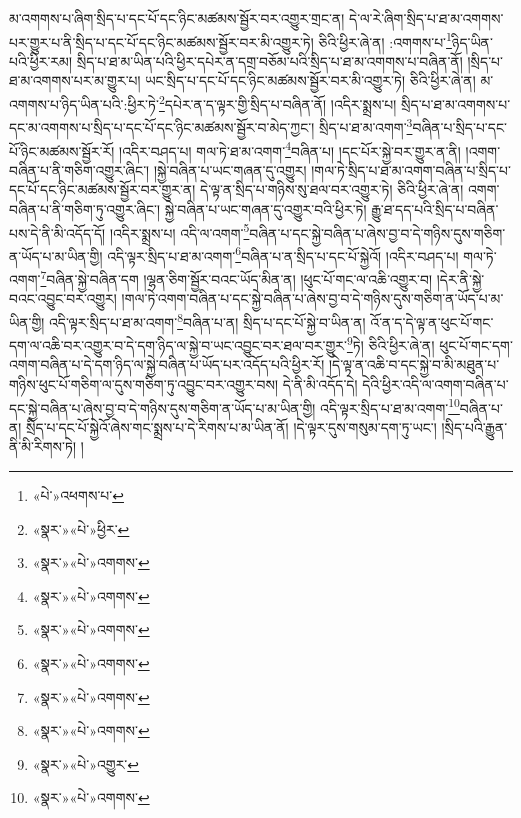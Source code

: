 མ་འགགས་པ་ཞིག་སྲིད་པ་དང་པོ་དང་ཉིང་མཚམས་སྦྱོར་བར་འགྱུར་གྲང་ན། དེ་ལ་རེ་ཞིག་སྲིད་པ་ཐ་མ་འགགས་པར་གྱུར་པ་ནི་སྲིད་པ་དང་པོ་དང་ཉིང་མཚམས་སྦྱོར་བར་མི་འགྱུར་ཏེ། ཅིའི་ཕྱིར་ཞེ་ན། :འགགས་པ་\footnote{«པེ་»འཕགས་པ་}ཉིད་ཡིན་པའི་ཕྱིར་རམ། སྲིད་པ་ཐ་མ་ཡིན་པའི་ཕྱིར་དཔེར་ན་དགྲ་བཅོམ་པའི་སྲིད་པ་ཐ་མ་འགགས་པ་བཞིན་ནོ། །སྲིད་པ་ཐ་མ་འགགས་པར་མ་གྱུར་པ། ཡང་སྲིད་པ་དང་པོ་དང་ཉིང་མཚམས་སྦྱོར་བར་མི་འགྱུར་ཏེ། ཅིའི་ཕྱིར་ཞེ་ན། མ་འགགས་པ་ཉིད་ཡིན་པའི་:ཕྱིར་ཏེ་\footnote{«སྣར་»«པེ་»ཕྱིར་}དཔེར་ན་ད་ལྟར་གྱི་སྲིད་པ་བཞིན་ནོ། །འདིར་སྨྲས་པ། སྲིད་པ་ཐ་མ་འགགས་པ་དང་མ་འགགས་པ་སྲིད་པ་དང་པོ་དང་ཉིང་མཚམས་སྦྱོར་བ་མེད་ཀྱང་། སྲིད་པ་ཐ་མ་འགག་\footnote{«སྣར་»«པེ་»འགགས་}བཞིན་པ་སྲིད་པ་དང་པོ་ཉིང་མཚམས་སྦྱོར་རོ། །འདིར་བཤད་པ། གལ་ཏེ་ཐ་མ་འགག་\footnote{«སྣར་»«པེ་»འགགས་}བཞིན་པ། །དང་པོར་སྐྱེ་བར་གྱུར་ན་ནི། །འགག་བཞིན་པ་ནི་གཅིག་འགྱུར་ཞིང་། །སྐྱེ་བཞིན་པ་ཡང་གཞན་དུ་འགྱུར། །གལ་ཏེ་སྲིད་པ་ཐ་མ་འགག་བཞིན་པ་སྲིད་པ་དང་པོ་དང་ཉིང་མཚམས་སྦྱོར་བར་གྱུར་ན། དེ་ལྟ་ན་སྲིད་པ་གཉིས་སུ་ཐལ་བར་འགྱུར་ཏེ། ཅིའི་ཕྱིར་ཞེ་ན། འགག་བཞིན་པ་ནི་གཅིག་ཏུ་འགྱུར་ཞིང་། སྐྱེ་བཞིན་པ་ཡང་གཞན་དུ་འགྱུར་བའི་ཕྱིར་ཏེ། རྒྱུ་ཐ་དད་པའི་སྲིད་པ་བཞིན་པས་དེ་ནི་མི་འདོད་དོ། །འདིར་སྨྲས་པ། འདི་ལ་འགག་\footnote{«སྣར་»«པེ་»འགགས་}བཞིན་པ་དང་སྐྱེ་བཞིན་པ་ཞེས་བྱ་བ་དེ་གཉིས་དུས་གཅིག་ན་ཡོད་པ་མ་ཡིན་གྱི། འདི་ལྟར་སྲིད་པ་ཐ་མ་འགག་\footnote{«སྣར་»«པེ་»འགགས་}བཞིན་པ་ན་སྲིད་པ་དང་པོ་སྐྱེའོ། །འདིར་བཤད་པ། གལ་ཏེ་འགག་\footnote{«སྣར་»«པེ་»འགགས་}བཞིན་སྐྱེ་བཞིན་དག །ལྷན་ཅིག་སྦྱོར་བའང་ཡོད་མིན་ན། །ཕུང་པོ་གང་ལ་འཆི་འགྱུར་བ། །དེར་ནི་སྐྱེ་བའང་འབྱུང་བར་འགྱུར། །གལ་ཏེ་འགག་བཞིན་པ་དང་སྐྱེ་བཞིན་པ་ཞེས་བྱ་བ་དེ་གཉིས་དུས་གཅིག་ན་ཡོད་པ་མ་ཡིན་གྱི། འདི་ལྟར་སྲིད་པ་ཐ་མ་འགག་\footnote{«སྣར་»«པེ་»འགགས་}བཞིན་པ་ན། སྲིད་པ་དང་པོ་སྐྱེ་བ་ཡིན་ན། འོ་ན་ད་དེ་ལྟ་ན་ཕུང་པོ་གང་དག་ལ་འཆི་བར་འགྱུར་བ་དེ་དག་ཉིད་ལ་སྐྱེ་བ་ཡང་འབྱུང་བར་ཐལ་བར་གྱུར་\footnote{«སྣར་»«པེ་»འགྱུར་}ཏེ། ཅིའི་ཕྱིར་ཞེ་ན། ཕུང་པོ་གང་དག་འགག་བཞིན་པ་དེ་དག་ཉིད་ལ་སྐྱེ་བཞིན་པ་ཡོད་པར་འདོད་པའི་ཕྱིར་རོ། །དེ་ལྟ་ན་འཆི་བ་དང་སྐྱེ་བ་མི་མཐུན་པ་གཉིས་ཕུང་པོ་གཅིག་ལ་དུས་གཅིག་ཏུ་འབྱུང་བར་འགྱུར་བས། དེ་ནི་མི་འདོད་དེ། དེའི་ཕྱིར་འདི་ལ་འགག་བཞིན་པ་དང་སྐྱེ་བཞིན་པ་ཞེས་བྱ་བ་དེ་གཉིས་དུས་གཅིག་ན་ཡོད་པ་མ་ཡིན་གྱི། འདི་ལྟར་སྲིད་པ་ཐ་མ་འགག་\footnote{«སྣར་»«པེ་»འགགས་}བཞིན་པ་ན། སྲིད་པ་དང་པོ་སྐྱེའོ་ཞེས་གང་སྨྲས་པ་དེ་རིགས་པ་མ་ཡིན་ནོ། །དེ་ལྟར་དུས་གསུམ་དག་ཏུ་ཡང་། །སྲིད་པའི་རྒྱུན་ནི་མི་རིགས་ཏེ། །
